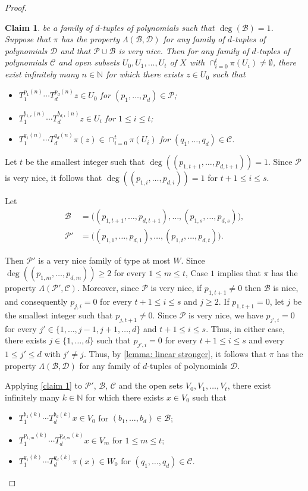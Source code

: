 \documentclass[11pt,reqno]{amsart}
\newcommand{\N}{\mathbb{N}}
\newcommand{\cB}{{\mathcal B}}
\newcommand{\cC}{{\mathcal C}}
\newcommand{\cP}{{\mathcal P}}
\newtheorem{claim}[claim]{Claim}
\theoremstyle{definition}
\theoremstyle{remark}
\begin{document}
\begin{proof}
\begin{claim}
    be a family of $d$-tuples of polynomials such that $\deg(\cB)=1$. Suppose that $\pi$ has the property $\Lambda(\cB,\mathcal{D})$ for any family of $d$-tuples of polynomials $\mathcal{D}$ and that $\cP\cup\cB$ is very nice. Then for any family of $d$-tuples of polynomials $\cC$ and open subsets $U_0,U_1,\dots,U_t$ of $X$ with $\cap_{i=0}^{t}\pi(U_i)\neq\emptyset$, there exist infinitely many $n\in \N$ for which there exists $z\in U_0$ such that\begin{itemize}
        \item $T_1^{p_1(n)}\cdots T_d^{p_d(n)}z\in U_0$ for $(p_1,\dots,p_d)\in \cP$;
        \item $T_1^{b_{1,i}(n)}\cdots T_d^{b_{d,i}(n)}z\in U_i$ for $1\leq i\leq t$;
        \item $T_1^{q_1(n)}\cdots T_d^{q_d(n)}\pi(z)\in \cap_{i=0}^{t}\pi(U_i)$ for $(q_1,\dots,q_d)\in \cC$.
    \end{itemize}\end{claim}

    Let $t$ be the smallest integer such that $\deg((p_{1,t+1},\dots,p_{d,t+1}))=1$. Since $\cP$ is very nice, it follows that $\deg((p_{1,i},\dots,p_{d,i}))=1$ for $t+1\leq i \leq s$.

    Let \begin{align*}
    \cB &= \big((p_{1,t+1},\dots,p_{d,t+1}),\dots,(p_{1,s},\dots,p_{d,s})\big),\\
    \cP' &= \big((p_{1,1},\dots,p_{d,1}),\dots,(p_{1,t},\dots,p_{d,t})\big).
    \end{align*}

Then $\cP'$ is a very nice family of type at most $W$. Since $\deg((p_{1,m},\dots,p_{d,m}))\geq 2$ for every $1\leq m\leq t$, Case $1$ implies that $\pi$ has the property $\Lambda(\cP',\cC)$. Moreover, since $\cP$ is very nice, if $p_{1,t+1}\neq 0$ then $\cB$ is nice, and consequently $p_{j,i}=0$ for every $t+1\leq i\leq s$ and $j\geq 2$. If $p_{1,t+1}=0$, let $j$ be the smallest integer such that $p_{j,t+1}\neq 0$. Since $\cP$ is very nice, we have $p_{j',i}= 0$ for every $j'\in \{1,\dots,j-1,j+1,\dots, d\}$ and $t+1\leq i \leq s$. Thus, in either case, there exists $j\in\{1,\dots,d\}$ such that $p_{j',i}=0$ for every $t+1\leq i\leq s$ and every $1\leq j'\leq d$ with $j'\neq j$. Thus, by \cref{lemma: linear stronger}, it follows that $\pi$ has the property $\Lambda(\cB,\mathcal{D})$ for any family of $d$-tuples of polynomials $\mathcal{D}$.


Applying \cref{claim 1} to $\cP'$, $\cB$, $\cC$ and the open sets $V_{0},V_{1},\dots,V_{t}$, there exist infinitely many $k\in \N$ for which there exists $x\in V_0$ such that \begin{itemize}
    \item $T_{1}^{b_1(k)}\cdots T_d^{b_d(k)}x \in V_0$ for $(b_1,\dots,b_d)\in \cB$;
    \item $T_{1}^{p_{1,m}(k)}\cdots T_{d}^{p_{d,m}(k)}x\in V_m$ for $1\leq m \leq t$;
    \item $T_{1}^{q_1(k)}\cdots T_{d}^{q_d(k)}\pi(x)\in W_0$ for $(q_1,\dots,q_d)\in \cC$.
\end{itemize}


\end{proof}
\end{document}
